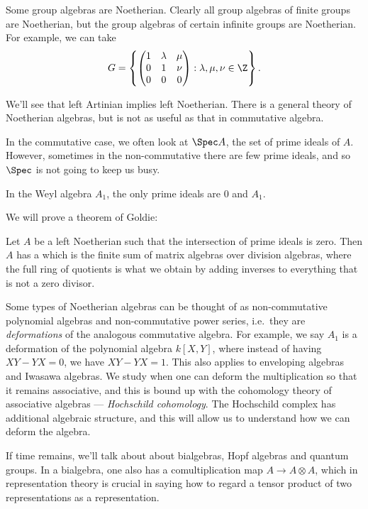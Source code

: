 \documentclass[a4paper]{article}
\begin{document}
\begin{eg}
  Some group algebras are Noetherian. Clearly all group algebras of finite groups are Noetherian, but the group algebras of certain infinite groups are Noetherian. For example, we can take
  \[
    G = \left\{
      \begin{pmatrix}
        1 & \lambda & \mu\\
        0 & 1 & \nu\\
        0 & 0 & 0
      \end{pmatrix}: \lambda, \mu, \nu \in \Z
    \right\}.
  \]
\end{eg}

We'll see that left Artinian implies left Noetherian. There is a general theory of Noetherian algebras, but is not as useful as that in commutative algebra.

In the commutative case, we often look at $\Spec A$, the set of prime ideals of $A$. However, sometimes in the non-commutative there are few prime ideals, and so $\Spec$ is not going to keep us busy.
\begin{eg}
  In the Weyl algebra $A_1$, the only prime ideals are $0$ and $A_1$.
\end{eg}

We will prove a theorem of Goldie:
\begin{thm}
  Let $A$ be a left Noetherian such that the intersection of prime ideals is zero. Then $A$ has a  which is the finite sum of matrix algebras over division algebras, where the full ring of quotients is what we obtain by adding inverses to everything that is not a zero divisor.
\end{thm}

Some types of Noetherian algebras can be thought of as non-commutative polynomial algebras and non-commutative power series, i.e.\ they are \emph{deformations} of the analogous commutative algebra. For example, we say $A_1$ is a deformation of the polynomial algebra $k[X, Y]$, where instead of having $XY - YX = 0$, we have $XY - YX = 1$. This also applies to enveloping algebras and Iwasawa algebras. We study when one can deform the multiplication so that it remains associative, and this is bound up with the cohomology theory of associative algebras --- \emph{Hochschild cohomology}. The Hochschild complex has additional algebraic structure, and this will allow us to understand how we can deform the algebra.

If time remains, we'll talk about about bialgebras, Hopf algebras and quantum groups. In a bialgebra, one also has a comultiplication map $A \to A \otimes A$, which in representation theory is crucial in saying how to regard a tensor product of two representations as a representation.
\end{document}
